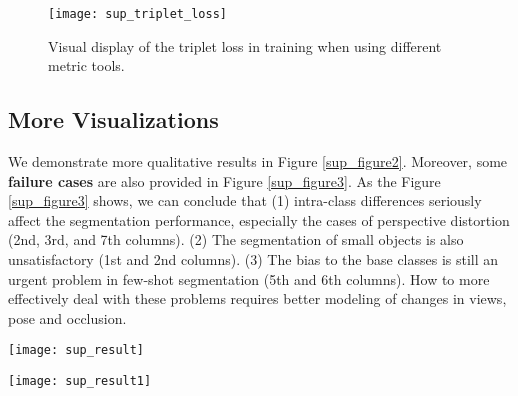 \documentclass[10pt,twocolumn,letterpaper]{article}
\begin{document}
\begin{figure}[htbp]
	\centering
	\texttt{[image: sup\_triplet\_loss]}
	\caption{Visual display of the triplet loss in training when using different metric tools.}
	\label{sup_figure4}
\end{figure}  

\subsection{More Visualizations}


\vspace{2mm}
We demonstrate more qualitative results in Figure \ref{sup_figure2}. Moreover, some \textbf{failure cases} are also provided in Figure \ref{sup_figure3}. As the Figure \ref{sup_figure3} shows, we can conclude that (1) intra-class differences seriously affect the segmentation performance, especially the cases of perspective distortion (2nd, 3rd, and 7th columns). (2) The segmentation of small objects is also unsatisfactory (1st and 2nd columns). (3) The bias to the base classes is still an urgent problem in few-shot segmentation (5th and 6th columns). How to more effectively deal with these problems requires better modeling of changes in views, pose and occlusion.


\begin{figure*}[htbp]
	\centering
	\texttt{[image: sup\_result]}
	\caption{Qualitative results of our method MIANet and baseline on PASCAL-5 and COCO-20 benchmarks. Zoom in for details.}
	\label{sup_figure2}
\end{figure*}

\begin{figure*}[htbp]
	\centering
	\texttt{[image: sup\_result1]}
	\caption{\textbf{Failure results} of our method MIANet and baseline on PASCAL-5 and COCO-20 benchmarks. Zoom in for details.}
	\label{sup_figure3}
\end{figure*}
\end{document}
